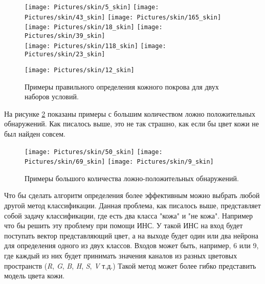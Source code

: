 \documentclass[12pt]{report}
\begin{document}
\begin{figure}[p]
	\centering	
	\texttt{[image: Pictures/skin/5\_skin]}\hspace{0.2cm}
	\texttt{[image: Pictures/skin/43\_skin]}\hspace{0.2cm}
	\texttt{[image: Pictures/skin/165\_skin]}
	\\[0.5cm]
	\texttt{[image: Pictures/skin/18\_skin]}\hspace{0.2cm}
	\texttt{[image: Pictures/skin/39\_skin]}
	\\[0.5cm]
	\texttt{[image: Pictures/skin/118\_skin]}\hspace{0.2cm}
	\texttt{[image: Pictures/skin/23\_skin]}
	
	\texttt{[image: Pictures/skin/12\_skin]}
	\caption{Примеры правильного определения кожного покрова для двух наборов условий.}	
	\label{fig:skin_contour_samples}
\end{figure}

На рисунке \ref{fig:many_false_possitives} показаны примеры с большим количеством ложно положительных обнаружений. 
Как писалось выше, это не так страшно, как если бы цвет кожи не был найден совсем.
\begin{figure}[h]
	\centering	
	\texttt{[image: Pictures/skin/50\_skin]}\hspace{0.2cm}
	\texttt{[image: Pictures/skin/69\_skin]}\hspace{0.2cm}
	\texttt{[image: Pictures/skin/9\_skin]}\hspace{0.2cm}
		
	\caption{Примеры большого количества ложно-положительных обнаружений.}	
	\label{fig:many_false_possitives}
\end{figure}

Что бы сделать алгоритм определения более эффективным можно выбрать любой другой метод классификации. Данная 
проблема, как писалось выше, представляет собой задачу классификации, где есть два класса "кожа" и "не кожа". 
Например что бы решить эту проблему при помощи ИНС. У такой ИНС на вход будет поступать вектор представляющий цвет, 
а 
на выходе будет один или два нейрона для определения одного из двух классов. Входов может быть, например, 6 или 9, 
где каждый из них будет принимать значения каналов из разных цветовых пространств (\textit{R}, \textit{G}, \textit
{B}, \textit{H}, \textit{S}, \textit{V} т.д.) Такой метод может более гибко представить модель цвета кожи.
\end{document}
